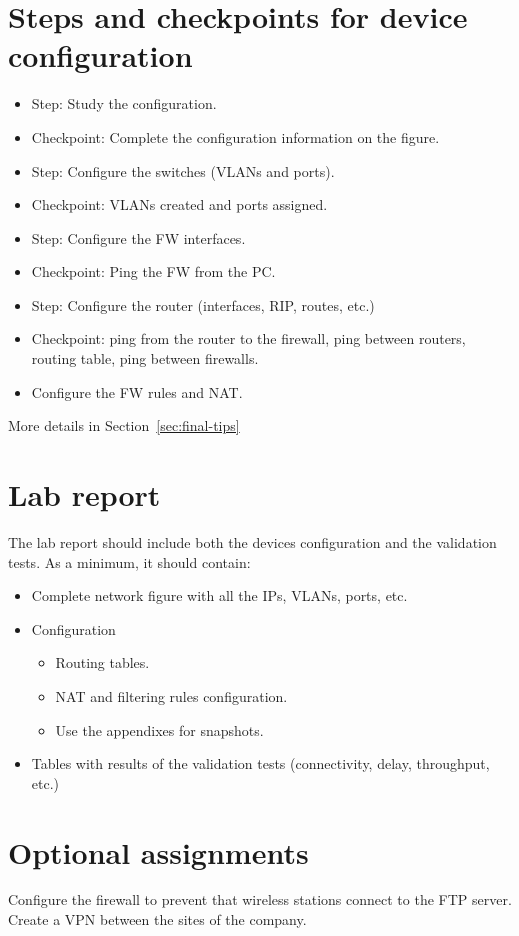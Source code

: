 \section{Steps and checkpoints for device configuration}
\begin{itemize}
\item Step: Study the configuration.
\item Checkpoint: Complete the configuration information on the figure.
\item Step: Configure the switches (VLANs and ports).
\item Checkpoint: VLANs created and ports assigned.
\item Step: Configure the FW interfaces.
\item Checkpoint: Ping the FW from the PC.
\item Step: Configure the router (interfaces, RIP, routes, etc.)
\item Checkpoint: ping from the router to the firewall, ping between routers, routing table, ping between firewalls.
\item Configure the FW rules and NAT.
\end{itemize}

More details in Section~\ref{sec:final-tips}

\section{Lab report}

The lab report should include both the devices configuration and the validation tests.
As a minimum, it should contain:
\begin{itemize}
\item Complete network figure with all the IPs, VLANs, ports, etc.
\item Configuration
\begin{itemize}
\item Routing tables.
\item NAT and filtering rules configuration.
\item Use the appendixes for snapshots.
\end{itemize}
\item Tables with results of the validation tests (connectivity, delay, throughput, etc.)
\end{itemize}

\section{Optional assignments}
Configure the firewall to prevent that wireless stations connect to the FTP server.
Create a VPN between the sites of the company.

